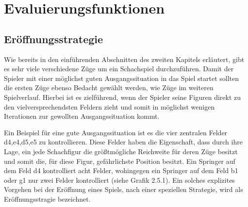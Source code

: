  

   
   

\section{Evaluierungsfunktionen}


\subsection{Eröffnungsstrategie}
Wie bereits in den einführenden Abschnitten des zweiten Kapitels erläutert, gibt es sehr viele verschiedene Züge um ein Schachspiel durchzuführen. Damit der Spieler mit einer möglichst guten Ausgangssituation in das Spiel startet sollten die ersten Züge ebenso Bedacht gewählt werden, wie Züge im weiteren Spielverlauf. Hierbei ist es zielführend, wenn der Spieler seine Figuren direkt zu den vielversprechendsten Feldern zieht und somit in möglichst wenigen Iterationen zur gewollten Ausgangssituation kommt.

Ein Beispiel für eine gute Ausgangssituation ist es die vier zentralen Felder d4,e4,d5,e5 zu kontrollieren. Diese Felder haben die Eigenschaft, dass durch ihre Lage, ein jede Schachfigur die größtmögliche Reichweite für deren Züge besitzt und somit die, für diese Figur, gefährlichste Position besitzt. Ein Springer auf dem Feld d4 kontrolliert acht Felder, wohingegen ein Springer auf dem Feld b1 oder g1 nur zwei Felder kontrolliert (siehe Grafik 2.5.1). Ein solches explizites Vorgehen bei der Eröffnung eines Spiels, nach einer speziellen Strategie, wird als Eröffnungsstragie bezeichnet. 

